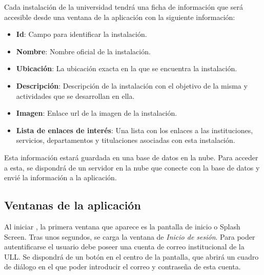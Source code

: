 Cada instalación de la universidad tendrá una ficha de información que será accesible desde una ventana de la aplicación con la siguiente información:

\begin{itemize}
    \item \textbf{Id}: Campo para identificar la instalación.
    \item \textbf{Nombre}: Nombre oficial de la instalación.
    \item \textbf{Ubicación}: La ubicación exacta en la que se encuentra la instalación. 
    \item \textbf{Descripción}: Descripción de la instalación con el objetivo de la misma y actividades que se desarrollan en ella.
    \item \textbf{Imagen}: Enlace url de la imagen de la instalación.
    \item \textbf{Lista de enlaces de interés}: Una lista con los enlaces a las instituciones, servicios, departamentos y titulaciones asociadas con esta instalación.
\end{itemize}

Esta información estará guardada en una base de datos en la nube. Para acceder a esta, se dispondrá de un servidor en la nube que conecte con la base de datos y envié la información a la aplicación.

\subsection{Ventanas de la aplicación}

 

  
Al iniciar \ULLAR{}, la primera ventana que aparece es la pantalla de inicio o Splash Screen. Tras unos segundos, se carga la ventana de \textit{Inicio de sesión}. Para poder autentificarse el usuario debe poseer una cuenta de correo institucional de la ULL. Se dispondrá de un botón en el centro de la pantalla, que abrirá un cuadro de diálogo en el que poder introducir el correo y contraseña de esta cuenta.
  
